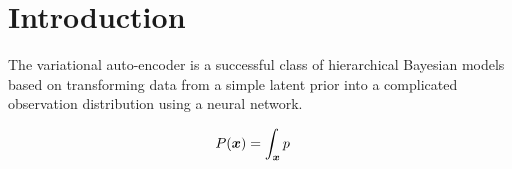 \section{Introduction}
\label{sec:introduction}

The variational auto-encoder is a successful class of hierarchical Bayesian models based on transforming data from a simple latent prior into a complicated observation distribution using a neural network.

\begin{align*}
    P({\boldsymbol{x}}) &= \int_{\boldsymbol{x}} p
\end{align*}




